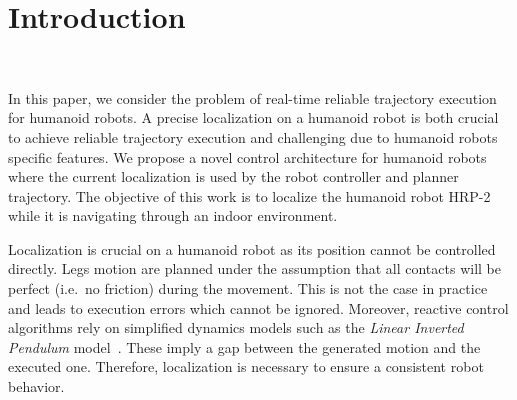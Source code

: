 \section{Introduction}~\label{sec:introduction}

In this paper, we consider the problem of real-time reliable
trajectory execution for humanoid robots. A precise localization on a
humanoid robot is both crucial to achieve reliable trajectory
execution and challenging due to humanoid robots specific features. We
propose a novel control architecture for humanoid robots where the
current localization is used by the robot controller and planner
trajectory. The objective of this work is to localize the humanoid
robot HRP-2~\cite{Kaneko04icra} while it is navigating through an
indoor environment.

Localization is crucial on a humanoid robot as its position cannot be
controlled directly. Legs motion are planned under the assumption that
all contacts will be perfect (i.e.\ no friction) during the
movement. This is not the case in practice and leads to execution
errors which cannot be ignored. Moreover, reactive control algorithms
rely on simplified dynamics models such as the \textit{Linear Inverted
  Pendulum} model~\cite{Kajita01iros}. These imply a gap between the
generated motion and the executed one. Therefore, localization is
necessary to ensure a consistent robot behavior.


